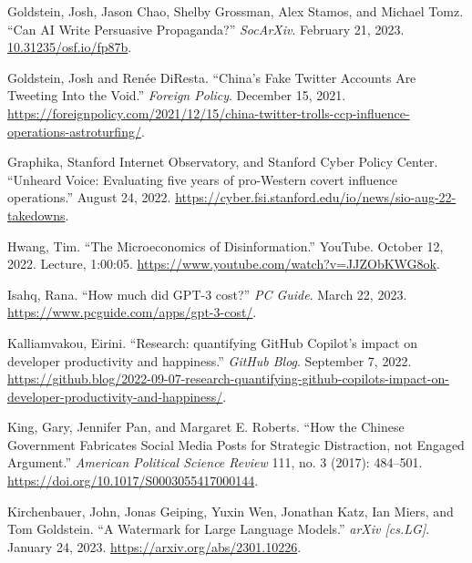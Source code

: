 \documentclass{article}
\begin{document}
\begin{thebibliography}{9}
  Goldstein, Josh, Jason Chao, Shelby Grossman, Alex Stamos, and Michael Tomz. ``Can AI Write Persuasive Propaganda?'' \textit{SocArXiv}. February 21, 2023. \href{10.31235/osf.io/fp87b}{10.31235/osf.io/fp87b}.

  Goldstein, Josh and Renée DiResta. ``China's Fake Twitter Accounts Are Tweeting Into the Void.'' \textit{Foreign Policy}. December 15, 2021. \href{https://foreignpolicy.com/2021/12/15/china-twitter-trolls-ccp-influence-operations-astroturfing/}{https://foreignpolicy.com/2021/12/15/china-twitter-trolls-ccp-influence-operations-astroturfing/}. 

  Graphika, Stanford Internet Observatory, and Stanford Cyber Policy Center. ``Unheard Voice: Evaluating five years of pro-Western covert influence operations.'' August 24, 2022. \href{https://cyber.fsi.stanford.edu/io/news/sio-aug-22-takedowns}{https://cyber.fsi.stanford.edu/io/news/sio-aug-22-takedowns}.

  Hwang, Tim. ``The Microeconomics of Disinformation.'' YouTube. October 12, 2022. Lecture, 1:00:05. \href{https://www.youtube.com/watch?v=JJZObKWG8ok}{https://www.youtube.com/watch?v=JJZObKWG8ok}.

  Isahq, Rana. ``How much did GPT-3 cost?'' \textit{PC Guide}. March 22, 2023. \href{https://www.pcguide.com/apps/gpt-3-cost/}{https://www.pcguide.com/apps/gpt-3-cost/}. 

  Kalliamvakou, Eirini. ``Research: quantifying GitHub Copilot's impact on developer productivity and happiness.'' \textit{GitHub Blog}. September 7, 2022. \href{https://github.blog/2022-09-07-research-quantifying-github-copilots-impact-on-developer-productivity-and-happiness/}{https://github.blog/2022-09-07-research-quantifying-github-copilots-impact-on-developer-productivity-and-happiness/}. 

  King, Gary, Jennifer Pan, and Margaret E. Roberts. ``How the Chinese Government Fabricates Social Media Posts for Strategic Distraction, not Engaged Argument.'' \textit{American Political Science Review} 111, no. 3 (2017): 484–501. \href{https://doi.org/10.1017/S0003055417000144}{https://doi.org/10.1017/S0003055417000144}. 

  Kirchenbauer, John, Jonas Geiping, Yuxin Wen, Jonathan Katz, Ian Miers, and Tom Goldstein. ``A Watermark for Large Language Models.'' \textit{arXiv [cs.LG]}. January 24, 2023. \href{https://arxiv.org/abs/2301.10226}{https://arxiv.org/abs/2301.10226}. 


\end{thebibliography}
\end{document}
